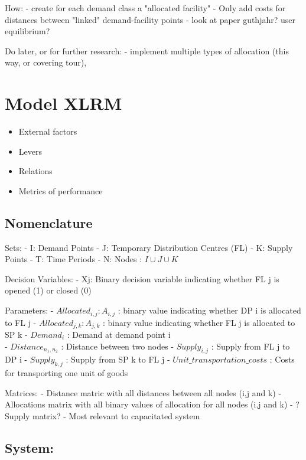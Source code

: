 \documentclass[11pt]{article}
\providecommand{\tightlist}{%
      \setlength{\itemsep}{0pt}\setlength{\parskip}{0pt}}
\begin{document}
How: - create for each demand class a "allocated facility" - Only add
costs for distances between "linked" demand-facility points - look at
paper guthjahr? user equilibrium?

    Do later, or for further research: - implement multiple types of
allocation (this way, or covering tour),

    \section{Model XLRM}\label{model-xlrm}

\begin{itemize}
\tightlist
\item
  External factors
\item
  Levers
\item
  Relations
\item
  Metrics of performance
\end{itemize}

    \subsection{Nomenclature}\label{nomenclature}

Sets: - I: Demand Points - J: Temporary Distribution Centres (FL) - K:
Supply Points - T: Time Periods - N: Nodes : \(I \cup J \cup K\)

Decision Variables: - Xj: Binary decision variable indicating whether FL
j is opened (1) or closed (0)

Parameters: - \(Allocated_{i,j} : A_{i,j}\) : binary value indicating
whether DP i is allocated to FL j - \(Allocated_{j,k} : A_{j,k}\) :
binary value indicating whether FL j is allocated to SP k - \(Demand_i\)
: Demand at demand point i\\
- \(Distance_{n_1,n_2}\) : Distance between two nodes - \(Supply_{i,j}\)
: Supply from FL j to DP i - \(Supply_{k,j}\) : Supply from SP k to FL j
- \(Unit\_transportation\_costs\) : Costs for transporting one unit of
goods

Matrices: - Distance matric with all distances between all nodes (i,j
and k) - Allocations matrix with all binary values of allocation for all
nodes (i,j and k) - ?Supply matrix? - Most relevant to capacitated
system

    \subsection{System:}\label{system}
\end{document}

